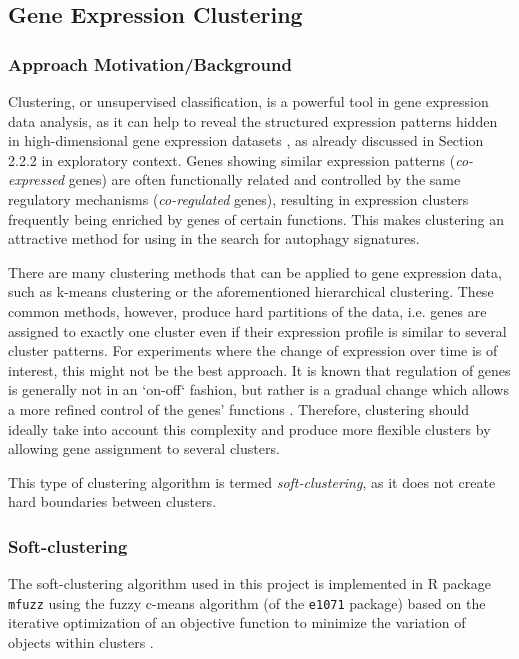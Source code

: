         


    \newpage
    \subsection{Gene Expression Clustering}
    
 
\subsubsection{Approach Motivation/Background}
Clustering, or unsupervised classification,  is a powerful tool in gene expression data analysis, as it can help to reveal the structured expression patterns hidden in high-dimensional gene expression datasets \cite{Kumar2007Mfuzz:Data}, as already discussed in Section 2.2.2 in exploratory context. Genes showing similar expression patterns (\textit{co-expressed} genes) are often functionally related and controlled by the same regulatory mechanisms (\textit{co-regulated} genes), resulting in expression clusters frequently being enriched by genes of certain functions. This makes clustering an attractive method for using in the search for autophagy signatures. 
 
There are many clustering methods that can be applied to gene expression data, such as k-means clustering or the aforementioned hierarchical clustering. These common methods, however, produce hard partitions of the data, i.e. genes are assigned to exactly one cluster even if their expression profile is similar to several cluster patterns. For experiments where the change of expression over time is of interest, this might not be the best approach. It is known that regulation of genes is generally not in an `on-off` fashion, but rather is a gradual change which allows a more refined control of the genes' functions  \cite{Kumar2007Mfuzz:Data}. Therefore, clustering should ideally take into account this complexity and produce more flexible clusters by allowing gene assignment to several clusters.
 
This type of clustering algorithm is termed \textit{soft-clustering}, as it does not  create hard boundaries between clusters. 
 
\subsubsection{Soft-clustering}
 
The soft-clustering algorithm used in this project is implemented in R package \texttt{mfuzz} \cite{Kumar2007Mfuzz:Data}  using the fuzzy c-means algorithm (of the \texttt{e1071} package) based on the iterative optimization of an
objective function to minimize the variation of objects within clusters  \cite{Bezdek1981PatternAlgorithms}.
 
